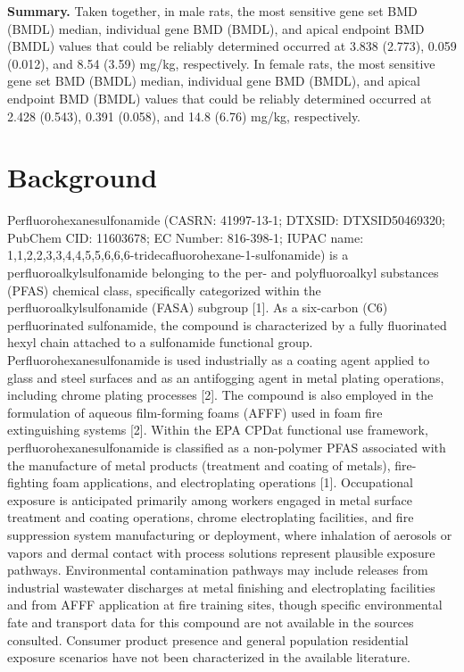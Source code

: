\noindent\textbf{Summary.} Taken together, in male rats, the most sensitive gene set BMD (BMDL) median, individual gene BMD (BMDL), and apical endpoint BMD (BMDL) values that could be reliably determined occurred at 3.838 (2.773), 0.059 (0.012), and 8.54 (3.59) mg/kg, respectively. In female rats, the most sensitive gene set BMD (BMDL) median, individual gene BMD (BMDL), and apical endpoint BMD (BMDL) values that could be reliably determined occurred at 2.428 (0.543), 0.391 (0.058), and 14.8 (6.76) mg/kg, respectively.

\clearpage
{}

\section{Background}

Perfluorohexanesulfonamide (CASRN: 41997-13-1; DTXSID: DTXSID50469320; PubChem CID: 11603678; EC Number: 816-398-1; IUPAC name: 1,1,2,2,3,3,4,4,5,5,6,6,6-tridecafluorohexane-1-sulfonamide) is a perfluoroalkylsulfonamide belonging to the per- and polyfluoroalkyl substances (PFAS) chemical class, specifically categorized within the perfluoroalkylsulfonamide (FASA) subgroup [1]. As a six-carbon (C6) perfluorinated sulfonamide, the compound is characterized by a fully fluorinated hexyl chain attached to a sulfonamide functional group. Perfluorohexanesulfonamide is used industrially as a coating agent applied to glass and steel surfaces and as an antifogging agent in metal plating operations, including chrome plating processes [2]. The compound is also employed in the formulation of aqueous film-forming foams (AFFF) used in foam fire extinguishing systems [2]. Within the EPA CPDat functional use framework, perfluorohexanesulfonamide is classified as a non-polymer PFAS associated with the manufacture of metal products (treatment and coating of metals), fire-fighting foam applications, and electroplating operations [1]. Occupational exposure is anticipated primarily among workers engaged in metal surface treatment and coating operations, chrome electroplating facilities, and fire suppression system manufacturing or deployment, where inhalation of aerosols or vapors and dermal contact with process solutions represent plausible exposure pathways. Environmental contamination pathways may include releases from industrial wastewater discharges at metal finishing and electroplating facilities and from AFFF application at fire training sites, though specific environmental fate and transport data for this compound are not available in the sources consulted. Consumer product presence and general population residential exposure scenarios have not been characterized in the available literature.

